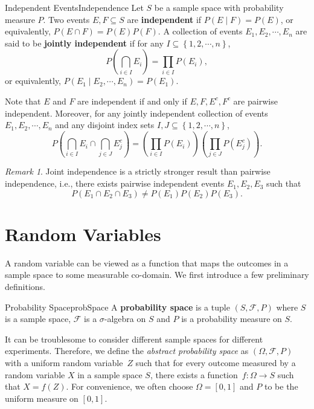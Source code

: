 \documentclass[math, code]{amznotes}
\theoremstyle{remark}
\newtheorem*{remark}{Remark}
\begin{document}
\begin{dfnbox}{Independent Events}{Independence}
    Let $S$ be a sample space with probability measure $P$. Two events $E, F \subseteq S$ are {\color{red} \textbf{independent}} if $P\left(E \mid F\right) = P\left(E\right)$, or equivalently, $P\left(E \cap F\right) = P\left(E\right)P\left(F\right)$. A collection of events $E_1, E_2, \cdots, E_n$ are said to be {\color{red} \textbf{jointly independent}} if for any $I \subseteq \left\{1, 2, \cdots, n\right\}$, 
    \begin{equation*}
        P\left(\bigcap_{i \in I}E_i\right) = \prod_{i \in I}P\left(E_i\right),
    \end{equation*}
    or equivalently, $P\left(E_1 \mid E_2, \cdots, E_n\right) = P\left(E_1\right)$.
\end{dfnbox}
Note that $E$ and $F$ are independent if and only if $E, F, E^c, F^c$ are pairwise independent. Moreover, for any jointly independent collection of events $E_1, E_2, \cdots, E_n$ and any disjoint index sets $I, J \subseteq \left\{1, 2, \cdots, n\right\}$,
\begin{equation*}
    P\left(\bigcap_{i \in I}E_i \cap \bigcap_{j \in J}E_j^c\right) = \left(\prod_{i \in I}P\left(E_i\right)\right)\left(\prod_{j \in J}P\left(E_j^c\right)\right).
\end{equation*}
\begin{notebox}
    \begin{remark}
        Joint independence is a strictly stronger result than pairwise independence, i.e., there exists pairwise independent events $E_1, E_2, E_3$ such that 
        \begin{equation*}
            P\left(E_1 \cap E_2 \cap E_3\right) \neq P\left(E_1\right)P\left(E_2\right)P\left(E_3\right).
        \end{equation*}
    \end{remark}
\end{notebox}
\section{Random Variables}
A random variable can be viewed as a function that maps the outcomes in a sample space to some measurable co-domain. We first introduce a few preliminary definitions.
\begin{dfnbox}{Probability Space}{probSpace}
    A {\color{red} \textbf{probability space}} is a tuple $\left(S, \mathcal{F}, P\right)$ where $S$ is a sample space, $\mathcal{F}$ is a $\sigma$-algebra on $S$ and $P$ is a probability measure on $S$.
\end{dfnbox}
It can be troublesome to consider different sample spaces for different experiments. Therefore, we define the \textit{abstract probability space} as $\left(\Omega, \mathcal{F}, P\right)$ with a uniform random variable~$Z$ such that for every outcome measured by a random variable $X$ in a sample space $S$, there exists a function~$f \colon \Omega \to S$ such that $X = f\left(Z\right)$. For convenience, we often choose $\Omega = \left[0, 1\right]$ and $P$ to be the uniform measure on $\left[0, 1\right]$.
\end{document}
